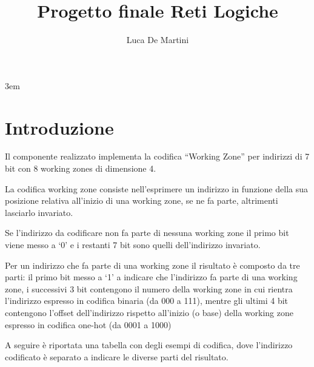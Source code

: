 \documentclass[a4paper]{article}
\title{Progetto finale Reti Logiche}
\author{Luca De Martini}
\date{}
\begin{document}
\setlength\parindent{0pt}
\emergencystretch 3em

\maketitle

\section{Introduzione}

Il componente realizzato implementa la codifica ``Working Zone'' per indirizzi di 7 bit con 8 working zones di dimensione 4.

La codifica working zone consiste nell'esprimere un indirizzo in funzione della sua posizione relativa all'inizio di una working zone, se ne fa parte, altrimenti lasciarlo invariato.

Se l'indirizzo da codificare non fa parte di nessuna working zone il primo bit viene messo a `0' e i restanti 7 bit sono quelli dell'indirizzo invariato.

Per un indirizzo che fa parte di una working zone il risultato è composto da tre parti: il primo bit messo a `1' a indicare che l'indirizzo fa parte di una working zone, i successivi 3 bit contengono il numero della working zone in cui rientra l'indirizzo espresso in codifica binaria (da 000 a 111), mentre gli ultimi 4 bit contengono l'offset dell'indirizzo rispetto all'inizio (o base) della working zone espresso in codifica one-hot (da 0001 a 1000)

A seguire è riportata una tabella con degli esempi di codifica, dove l'indirizzo codificato è separato a indicare le diverse parti del risultato.
\end{document}
